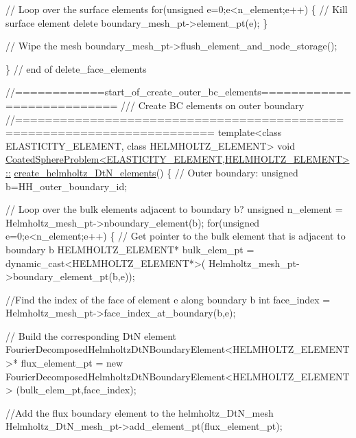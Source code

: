 \begin{DoxyCodeInclude}
{ \textcolor{comment}{// Loop over the surface elements}
 \textcolor{keywordflow}{for}(\textcolor{keywordtype}{unsigned} e=0;e<n\_element;e++)
  \{
   \textcolor{comment}{//   Kill surface element}
   \textcolor{keyword}{delete} boundary\_mesh\_pt->element\_pt(e);
  \}
 
 \textcolor{comment}{// Wipe the mesh}
 boundary\_mesh\_pt->flush\_element\_and\_node\_storage();
 
\} \textcolor{comment}{// end of delete\_face\_elements}



\textcolor{comment}{//============start\_of\_create\_outer\_bc\_elements===========================}\textcolor{comment}{}
\textcolor{comment}{/// Create BC elements on outer boundary}
\textcolor{comment}{}\textcolor{comment}{//========================================================================}
\textcolor{keyword}{template}<\textcolor{keyword}{class} ELASTICITY\_ELEMENT, \textcolor{keyword}{class} HELMHOLTZ\_ELEMENT>
\textcolor{keywordtype}{void} \hyperlink{classCoatedSphereProblem_a867f4ed706f00a73c87c2c862dcf19c3}{CoatedSphereProblem<ELASTICITY\_ELEMENT,HELMHOLTZ\_ELEMENT>::}
\hyperlink{classCoatedSphereProblem_a867f4ed706f00a73c87c2c862dcf19c3}{create\_helmholtz\_DtN\_elements}()
\{
 \textcolor{comment}{// Outer boundary:}
 \textcolor{keywordtype}{unsigned} b=HH\_outer\_boundary\_id;

 \textcolor{comment}{// Loop over the bulk elements adjacent to boundary b?}
 \textcolor{keywordtype}{unsigned} n\_element = Helmholtz\_mesh\_pt->nboundary\_element(b);
 \textcolor{keywordflow}{for}(\textcolor{keywordtype}{unsigned} e=0;e<n\_element;e++)
  \{
   \textcolor{comment}{// Get pointer to the bulk element that is adjacent to boundary b}
   HELMHOLTZ\_ELEMENT* bulk\_elem\_pt = \textcolor{keyword}{dynamic\_cast<}HELMHOLTZ\_ELEMENT*\textcolor{keyword}{>}(
    Helmholtz\_mesh\_pt->boundary\_element\_pt(b,e));
   
   \textcolor{comment}{//Find the index of the face of element e along boundary b }
   \textcolor{keywordtype}{int} face\_index = Helmholtz\_mesh\_pt->face\_index\_at\_boundary(b,e);
   
   \textcolor{comment}{// Build the corresponding DtN element}
   FourierDecomposedHelmholtzDtNBoundaryElement<HELMHOLTZ\_ELEMENT>* 
    flux\_element\_pt = \textcolor{keyword}{new} 
    FourierDecomposedHelmholtzDtNBoundaryElement<HELMHOLTZ\_ELEMENT>
    (bulk\_elem\_pt,face\_index);
   
   \textcolor{comment}{//Add the flux boundary element to the  helmholtz\_DtN\_mesh}
   Helmholtz\_DtN\_mesh\_pt->add\_element\_pt(flux\_element\_pt);
   
}
\end{DoxyCodeInclude}
